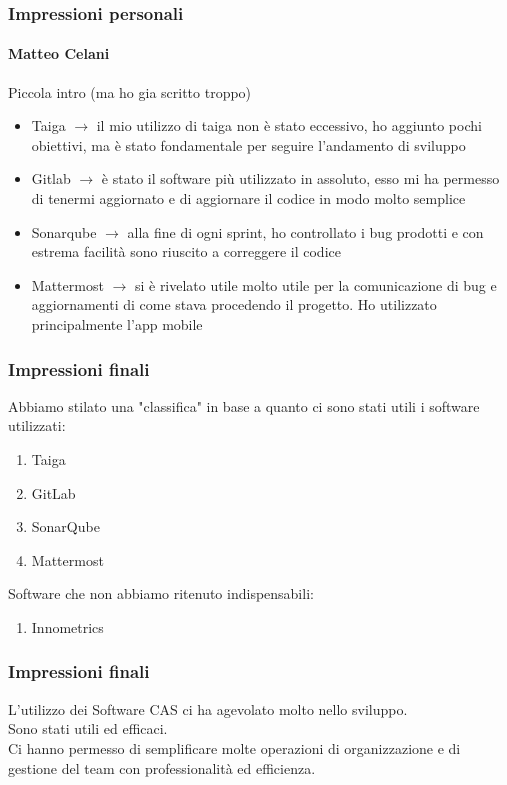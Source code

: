 \documentclass{beamer}
\begin{document}
\begin{frame}
\frametitle{Impressioni personali}
\framesubtitle{Matteo Celani}
Piccola intro (ma ho gia scritto troppo)
\begin{itemize}
	\item Taiga $\to$ il mio utilizzo di taiga non è stato eccessivo, ho aggiunto pochi obiettivi, ma è stato fondamentale per seguire l'andamento di sviluppo 
	\item Gitlab $\to$ è stato il software più utilizzato in assoluto, esso mi ha permesso di tenermi aggiornato e di aggiornare il codice in modo molto semplice
	\item Sonarqube $\to$ alla fine di ogni sprint, ho controllato i bug prodotti e con estrema facilità sono riuscito a correggere il codice
	\item Mattermost  $\to$ si è rivelato utile molto utile per la comunicazione di bug e aggiornamenti di come stava procedendo il progetto. Ho utilizzato principalmente l'app mobile
  \end{itemize}
\end{frame}

\begin{frame}
\frametitle{Impressioni finali}
Abbiamo stilato una "classifica" in base a quanto ci sono stati utili i software utilizzati:
  \begin{enumerate}
	\item Taiga
	\item GitLab
	\item SonarQube
	\item Mattermost
  \end{enumerate}
  Software che non abbiamo ritenuto indispensabili:
  \begin{enumerate}
	\item Innometrics
  \end{enumerate}
\end{frame}

\begin{frame}
\frametitle{Impressioni finali}
L'utilizzo dei Software CAS ci ha agevolato molto nello sviluppo. \\
Sono stati utili ed efficaci.\\
Ci hanno permesso di semplificare molte operazioni di organizzazione e di gestione del team con professionalità ed efficienza.

\end{frame}
\end{document}
